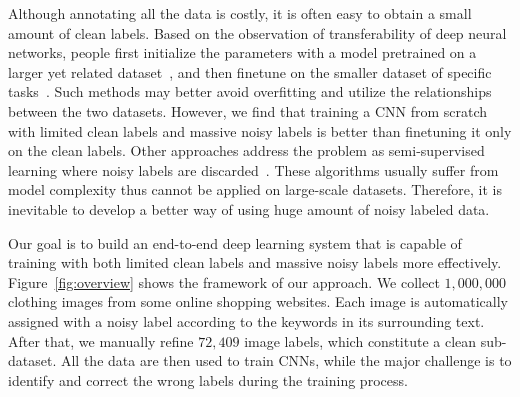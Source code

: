 \documentclass[10pt,twocolumn,letterpaper]{article}
\begin{document}
Although annotating all the data is costly, it is often easy to obtain a small amount of clean labels. Based on the observation of transferability of deep neural networks, people first initialize the parameters with a model pretrained on a larger yet related dataset~\cite{krizhevsky2012imagenet}, and then finetune on the smaller dataset of specific tasks~\cite{oquab2013learning,azizpour2014generic,donahue2013decaf}. Such methods may better avoid overfitting and utilize the relationships between the two datasets. However, we find that training a CNN from scratch with limited clean labels and massive noisy labels is better than finetuning it only on the clean labels. Other approaches address the problem as semi-supervised learning where noisy labels are discarded~\cite{zhu2002learning}. These algorithms usually suffer from model complexity thus cannot be applied on large-scale datasets. Therefore, it is inevitable to develop a better way of using huge amount of noisy labeled data.

Our goal is to build an end-to-end deep learning system that is capable of training with both limited clean labels and massive noisy labels more effectively. Figure~\ref{fig:overview} shows the framework of our approach. We collect $1,000,000$ clothing images from some online shopping websites. Each image is automatically assigned with a noisy label according to the keywords in its surrounding text. After that, we manually refine $72,409$ image labels, which constitute a clean sub-dataset. All the data are then used to train CNNs, while the major challenge is to identify and correct the wrong labels during the training process.
\end{document}
